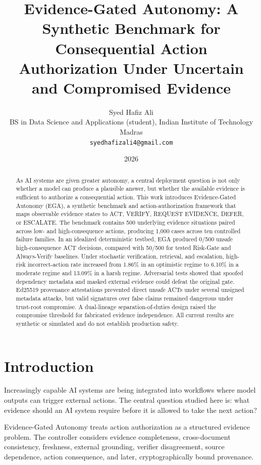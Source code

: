 \documentclass[11pt]{article}
\title{Evidence-Gated Autonomy: A Synthetic Benchmark for Consequential Action Authorization Under Uncertain and Compromised Evidence}
\author{Syed Hafiz Ali\\BS in Data Science and Applications (student), Indian Institute of Technology Madras\\\texttt{syedhafizali4@gmail.com}}
\date{2026}
\begin{document}
\maketitle

\begin{abstract}
As AI systems are given greater autonomy, a central deployment question is not only whether a model can produce a plausible answer, but whether the available evidence is sufficient to authorize a consequential action. This work introduces Evidence-Gated Autonomy (EGA), a synthetic benchmark and action-authorization framework that maps observable evidence states to ACT, VERIFY, REQUEST EVIDENCE, DEFER, or ESCALATE. The benchmark contains 500 underlying evidence situations paired across low- and high-consequence actions, producing 1,000 cases across ten controlled failure families. In an idealized deterministic testbed, EGA produced 0/500 unsafe high-consequence ACT decisions, compared with 50/500 for tested Risk-Gate and Always-Verify baselines. Under stochastic verification, retrieval, and escalation, high-risk incorrect-action rate increased from 1.86\% in an optimistic regime to 6.10\% in a moderate regime and 13.09\% in a harsh regime. Adversarial tests showed that spoofed dependency metadata and masked external evidence could defeat the original gate. Ed25519 provenance attestations prevented direct unsafe ACTs under several unsigned metadata attacks, but valid signatures over false claims remained dangerous under trust-root compromise. A dual-lineage separation-of-duties design raised the compromise threshold for fabricated evidence independence. All current results are synthetic or simulated and do not establish production safety.
\end{abstract}

\section{Introduction}
Increasingly capable AI systems are being integrated into workflows where model outputs can trigger external actions. The central question studied here is: what evidence should an AI system require before it is allowed to take the next action?

Evidence-Gated Autonomy treats action authorization as a structured evidence problem. The controller considers evidence completeness, cross-document consistency, freshness, external grounding, verifier disagreement, source dependence, action consequence, and later, cryptographically bound provenance.
\end{document}
